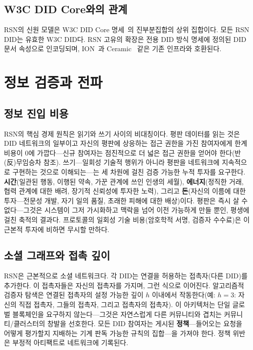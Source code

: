 \documentclass[11pt,a4paper,twocolumn]{article}
\begin{document}
\subsection{W3C DID Core와의 관계}

RSN의 신원 모델은 W3C DID Core 명세~\cite{did2022}의 진부분집합의 상위 집합이다. 모든 RSN DID는 유효한 W3C DID다. RSN 고유의 확장은 전용 DID 방식 명세에 정의된 DID 문서 속성으로 인코딩되며, ION~\cite{buchner2021}과 Ceramic~\cite{ceramic2023} 같은 기존 인프라와 호환된다.

\section{정보 검증과 전파}

\subsection{정보 진입 비용}

RSN의 핵심 경제 원칙은 읽기와 쓰기 사이의 비대칭이다. 평판 데이터를 읽는 것은 DID 네트워크의 일부이고 자신의 평판에 상응하는 접근 권한을 가진 참여자에게 한계 비용이 0에 가깝다---신규 참여자는 점진적으로 더 넓은 접근 권한을 얻어야 한다(반(反)무임승차 참조). 쓰기---일회성 기술적 행위가 아니라 평판을 네트워크에 지속적으로 구현하는 것으로 이해되는---는 세 차원에 걸친 검증 가능한 누적 투자를 요구한다. \textbf{시간}(일관된 행동, 이행된 약속, 가꾼 관계에 쓰인 인생의 세월), \textbf{에너지}(정직한 거래, 협력 관계에 대한 배려, 장기적 신뢰성에 투자한 노력), 그리고 \textbf{돈}(자신의 이름에 대한 투자---전문성 개발, 자기 일의 품질, 초래한 피해에 대한 배상)이다. 평판은 즉시 살 수 없다---그것은 시스템이 그저 가시화하고 맥락을 넘어 이전 가능하게 만들 뿐인, 평생에 걸친 축적의 결과다. 프로토콜의 일회성 기술 비용(암호학적 서명, 검증자 수수료)은 이 근본적 투자에 비하면 무시할 만하다.

\subsection{소셜 그래프와 접촉 깊이}

RSN은 근본적으로 소셜 네트워크다. 각 DID는 연결을 허용하는 접촉자(다른 DID)를 추가한다. 이 접촉자들은 자신의 접촉자를 가지며, 그런 식으로 이어진다. 알고리즘적 검증자 탐색은 연결된 접촉자의 설정 가능한 깊이 $h$ 이내에서 작동한다(예: $h=3$: 자신의 직접 접촉자, 그들의 접촉자, 그리고 접촉자의 접촉자). 이 아키텍처는 단일 글로벌 블록체인을 요구하지 않는다---그것은 자연스럽게 다른 커뮤니티와 겹치는 커뮤니티/클러스터의 창발을 선호한다. 모든 DID 참여자는 게시된 \textbf{정책}---들어오는 요청을 어떻게 평가할지 지배하는 기계 판독 가능한 규칙의 집합---을 가져야 한다. 정책 위반은 부정적 아티팩트로 네트워크에 기록된다.
\end{document}
